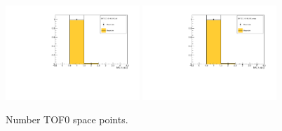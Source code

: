 \begin{figure}[!tbh]
    \includegraphics*[width=0.45\textwidth]{02-Cuts/Figures/2017-2.7_10-140_lH2_full/tof_tof0_n_sp_us_cut.pdf}
    \includegraphics*[width=0.45\textwidth]{02-Cuts/Figures/2017-2.7_10-140_lH2_empty/tof_tof0_n_sp_us_cut.pdf}
    \caption{Number TOF0 space points.
\label{fig:n_tof0_sp}}
\end{figure}

